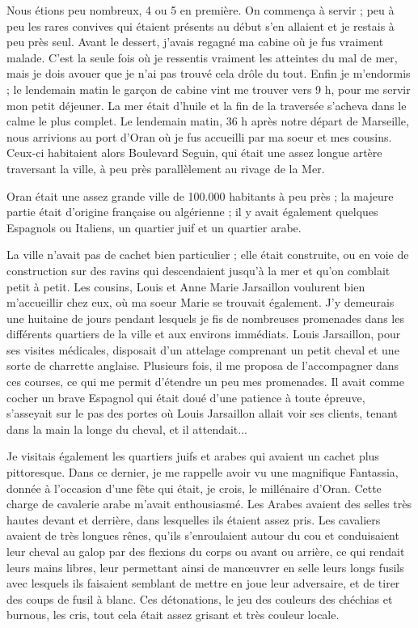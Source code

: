 \documentclass[11pt,a4paper]{report}
\begin{document}
Nous étions peu nombreux, 4 ou 5 en première. On commença à servir ; peu à peu les rares convives qui étaient présents au début s'en allaient et je restais à peu près seul. Avant le dessert, j'avais regagné ma cabine où je fus vraiment malade. C'est la seule fois où je ressentis vraiment les atteintes du mal de mer, mais je dois avouer que je n'ai pas trouvé cela drôle du tout. Enfin je m'endormis ; le lendemain matin le garçon de cabine vint me trouver vers 9 h, pour me servir mon petit déjeuner. La mer était d'huile et la fin de la traversée s'acheva dans le calme le plus complet. Le lendemain matin, 36 h après notre départ de Marseille, nous arrivions au port d'Oran où je fus accueilli par ma soeur et mes cousins. Ceux-ci habitaient alors Boulevard Seguin, qui était une assez longue artère traversant la ville, à peu près parallèlement au rivage de la Mer.

Oran était une assez grande ville de 100.000 habitants à peu près ; la majeure partie était d'origine française ou algérienne ; il y avait également quelques Espagnols ou Italiens, un quartier juif et un quartier arabe.

La ville n'avait pas de cachet bien particulier ; elle était construite, ou en voie de construction sur des ravins qui descendaient jusqu'à la mer et qu'on comblait petit à petit. Les cousins, Louis et Anne Marie Jarsaillon voulurent bien m'accueillir chez eux, où ma soeur Marie se trouvait également. J'y demeurais une huitaine de jours pendant lesquels je fis de nombreuses promenades dans les différents quartiers de la ville et aux environs immédiats. Louis Jarsaillon, pour ses visites médicales, disposait d'un attelage comprenant un petit cheval et une sorte de charrette anglaise. Plusieurs fois, il me proposa de l'accompagner dans ces courses, ce qui me permit d'étendre un peu mes promenades. Il avait comme cocher un brave Espagnol qui était doué d'une patience à toute épreuve, s'asseyait sur le pas des portes où Louis Jarsaillon allait voir ses clients, tenant dans la main la longe du cheval, et il attendait...

Je visitais également les quartiers juifs et arabes qui avaient un cachet plus pittoresque. Dans ce dernier, je me rappelle avoir vu une magnifique Fantassia, donnée à l'occasion d'une fête qui était, je crois, le millénaire d'Oran. Cette charge de cavalerie arabe m'avait enthousiasmé. Les Arabes avaient des selles très hautes devant et derrière, dans lesquelles ils étaient assez pris. Les cavaliers avaient de très longues rênes, qu'ils s'enroulaient autour du cou et conduisaient leur cheval au galop par des flexions du corps ou avant ou arrière, ce qui rendait leurs mains libres, leur permettant ainsi de manœuvrer en selle leurs longs fusils avec lesquels ils faisaient semblant de mettre en joue leur adversaire, et de tirer des coups de fusil à blanc. Ces détonations, le jeu des couleurs des chéchias et burnous, les cris, tout cela était assez grisant et très couleur locale.
\end{document}
